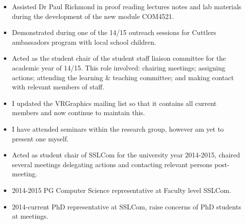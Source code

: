 \begin{itemize}
  \item Assisted Dr Paul Richmond in proof reading lectures notes and lab materials during the development of the new module COM4521.
  \item Demonstrated during one of the 14/15 outreach sessions for Cuttlers ambassadors program with local school children.
  \item Acted as the student chair of the student staff liaison committee for the academic year of 14/15. This role involved: chairing meetings; assigning actions; attending the learning \& teaching committee; and making contact with relevant members of staff.
  \item I updated the VRGraphics mailing list so that it contains all current members and now continue to maintain this.
  \item I have attended seminars within the research group, however am yet to present one myself.
  \item Acted as student chair of SSLCom for the university year 2014-2015, chaired several meetings delegating actions and contacting relevant persons post-meeting.
  \item 2014-2015 PG Computer Science representative at Faculty level SSLCom.
  \item 2014-current PhD representative at SSLCom, raise concerns of PhD students at meetings.
  
\end{itemize}